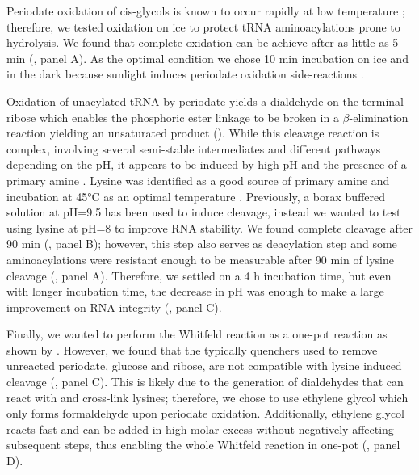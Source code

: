 \documentclass[9pt,lineno]{elife}
\begin{document}
Periodate oxidation of cis-glycols is known to occur rapidly at low temperature \citep{Dyer1956-zh}; therefore, we tested oxidation on ice to protect tRNA aminoacylations prone to hydrolysis.
We found that complete oxidation can be achieve after as little as 5 min (, panel A).
As the optimal condition we chose 10 min incubation on ice and in the dark because sunlight induces periodate oxidation side-reactions \citep{Erskine1953-cr}.

Oxidation of unacylated tRNA by periodate yields a dialdehyde on the terminal ribose which enables the phosphoric ester linkage to be broken in a $\beta$-elimination reaction \citep{Rammler1971-mt, uziel1973periodate} yielding an unsaturated product ().
While this cleavage reaction is complex, involving several semi-stable intermediates and different pathways depending on the pH, it appears to be induced by high pH and the presence of a primary amine \citep{Uziel1975-ja}.
Lysine was identified as a good source of primary amine and incubation at 45°C as an optimal temperature \citep{Khym1961-xf, Neu1964-hu}.
Previously, a borax buffered solution at pH=9.5 has been used to induce cleavage, instead we wanted to test using lysine at pH=8 to improve RNA stability.
We found complete cleavage after 90 min (, panel B); however, this step also serves as deacylation step and some aminoacylations were resistant enough to be measurable after 90 min of lysine cleavage (, panel A).
Therefore, we settled on a 4 h incubation time, but even with longer incubation time, the decrease in pH was enough to make a large improvement on RNA integrity (, panel C).

Finally, we wanted to perform the Whitfeld reaction as a one-pot reaction as shown by \cite{Watkins2022-er}.
However, we found that the typically quenchers used to remove unreacted periodate, glucose and ribose, are not compatible with lysine induced cleavage (, panel C).
This is likely due to the generation of dialdehydes that can react with and cross-link lysines; therefore, we chose to use ethylene glycol which only forms formaldehyde upon periodate oxidation.
Additionally, ethylene glycol reacts fast and can be added in high molar excess without negatively affecting subsequent steps, thus enabling the whole Whitfeld reaction in one-pot (, panel D).
\end{document}
